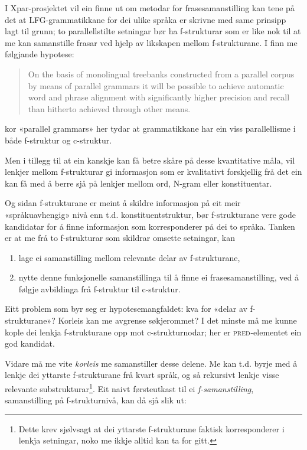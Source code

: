 \documentclass[12pt,a4paper,oneside,draft]{report}
\newcommand{\F}[2]{\textsc{#1}\ensuremath{_{#2}}}
\newcommand{\PRED}{\F{pred}{}}
\begin{document}
I Xpar-prosjektet vil ein finne ut om metodar for frasesamanstilling
kan tene på det at LFG-grammatikkane for dei ulike språka er skrivne
med same prinsipp lagt til grunn; to parallellstilte setningar bør ha
f-strukturar som er like nok til at me kan samanstille frasar ved
hjelp av likskapen mellom f-strukturane. I \citet[s.~72]{dyvik2009lmp}
finn me følgjande hypotese:

\begin{quote}
On the basis of monolingual treebanks constructed from a parallel
corpus by means of parallel grammars it will be possible to achieve
automatic word and phrase alignment with significantly higher
precision and recall than hitherto achieved through other means.
\end{quote}

kor «parallel grammars» her tydar at grammatikkane har ein viss
parallellisme i både f-struktur og c-struktur.

Men i tillegg til at ein kanskje kan få betre skåre på desse
kvantitative måla, vil lenkjer mellom f-strukturar gi informasjon som
er kvalitativt forskjellig frå det ein kan få med å berre sjå på
lenkjer mellom ord, N-gram eller konstituentar.


Og sidan f-strukturane er meint å skildre informasjon på eit meir
«språkuavhengig» nivå enn t.d. konstituentstruktur, bør f-strukturane
vere gode kandidatar for å finne informasjon som korresponderer på dei
to språka. Tanken er at me frå to f-strukturar
som skildrar omsette setningar, kan
\begin{enumerate}
\item lage ei samanstilling mellom relevante delar av f-strukturane,
\item nytte denne funksjonelle samanstillinga til å finne ei
   frasesamanstilling, ved å følgje avbildinga frå f-struktur til
   c-struktur.
\end{enumerate}
Eitt problem som byr seg er hypotesemangfaldet: kva for «delar av
f-strukturane»? Korleis kan me avgrense søkjerommet? I det minste må
me kunne kople dei lenkja f-strukturane opp mot c-strukturnodar; her
er \PRED{}-elementet ein god kandidat.

Vidare må me vite \emph{korleis} me samanstiller desse delene. Me kan
t.d. byrje med å lenkje dei yttarste f-strukturane frå kvart språk, og
så rekursivt lenkje visse relevante substrukturar\footnote{Dette krev sjølvsagt at dei yttarste f-strukturane faktisk
        korresponderer i lenkja setningar, noko me ikkje alltid kan ta
        for gitt. }.  Eit naivt
førsteutkast til ei \emph{f-samanstilling}, samanstilling på
f-strukturnivå, kan då sjå slik ut:
\end{document}

